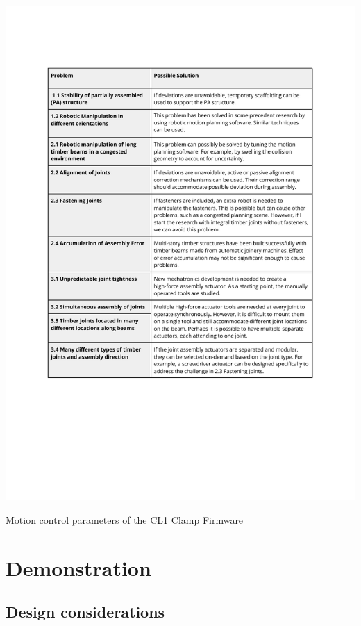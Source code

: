 \begin{table}[h]
    \includegraphics[page=9, trim=25.4mm 220mm 25.4mm 33mm, clip, width=\textwidth]{tables/Tables in Chapter 4.pdf}
    \caption{Motion control parameters of the CL1 Clamp Firmware}
    \label{table:cl1-firmware-motion-control-parameters}
\end{table}

\FloatBarrier

\section{Demonstration}
\label{section:exploration-1-demonstration}

\subsection{Design considerations}
\label{subsection:exploration-1-design-considerations}

